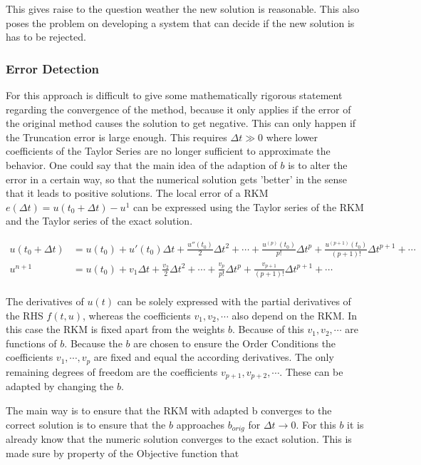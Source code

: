 \documentclass{article}
\begin{document}
This gives raise to the question weather the new solution is reasonable.
This also poses the problem on developing a system that can decide if the new solution is has to be rejected. 


 
\subsubsection{Error Detection}
For this approach is difficult to give some mathematically rigorous statement regarding the convergence of the method, because it only applies if the error of the original method causes the solution to get negative. This can only happen if the Truncation error is large enough. This requires $\Delta t \gg 0$ where lower coefficients of the Taylor Series are no longer sufficient to approximate the behavior. 
One could say that the main idea of the adaption of $b$ is to alter the error in a certain way, so that the numerical solution gets 'better' in the sense that it leads to positive solutions. 
The local error of a RKM $e(\Delta t) =u(t_0 + \Delta t) - u^1$ can be expressed using the Taylor series of the RKM and the Taylor series of the exact solution. %

\begin{align}\label{eq:Taylor_sol_ref}
u(t_0 + \Delta t) &= u(t_0) + u'(t_0) \Delta t + \frac{u''(t_0)}{2} \Delta t^2 + \cdots + \frac{u^{(p)}(t_0)}{p!} \Delta t^p + \frac{u^{(p+1)}(t_0)}{(p+1)!} \Delta t^{p+1} + \cdots \\
u^{n+1} &= u(t_0)  + v_1 \Delta t + \frac{v_2}{2} \Delta t^2 + \cdots + \frac{v_p}{p!} \Delta t^p + \frac{v_{p+1}}{(p+1)!} \Delta t^{p+1} + \cdots \\
\end{align}

The derivatives of $u(t)$ can be solely expressed with the partial derivatives of the RHS $f(t,u)$, whereas the coefficients $v_1,v_2,\cdots$ also depend on the RKM. 
In this case the RKM is fixed apart from the weights $b$. 
Because of this $v_1,v_2,\cdots$ are functions of $b$.
Because the $b$ are chosen to ensure the Order Conditions the coefficients $v_1,\cdots,v_p$ are fixed and equal the according derivatives. 
The only remaining degrees of freedom are the coefficients $v_{p+1},v_{p+2},\cdots$.
These can be adapted by changing the $b$.

The main way is to ensure that the RKM with adapted b converges to the correct solution is to ensure that the $b$ approaches $b_{orig}$ for $\Delta t \to 0$. For this $b$ it is already know that the numeric solution converges to the exact solution.  
This is made sure by property of the Objective function that 
\end{document}
